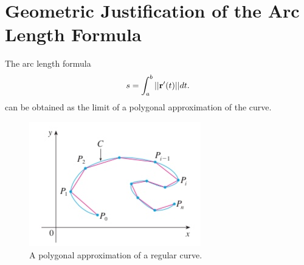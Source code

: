 \documentclass[12pt,letterpaper,reqno]{article}
\numberwithin{equation}{section}
\newcommand{\bbr}{{\bf r}}
\begin{document}
{\appendix
\section{Geometric Justification of the Arc Length Formula}\label{app:arc_length}
\begin{prop}
The arc length formula 
\begin{align}
	s=\int_a^b||\bbr'(t)||dt.
\end{align}
can be obtained as the limit of a polygonal approximation of the curve.
\end{prop}

\begin{figure}[h]
	\begin{center}
	\includegraphics[scale=0.5]{figures_mvc/polygonal_approx}
\end{center}
\caption{A polygonal approximation of a regular curve.}
\end{figure}

}
\end{document}
